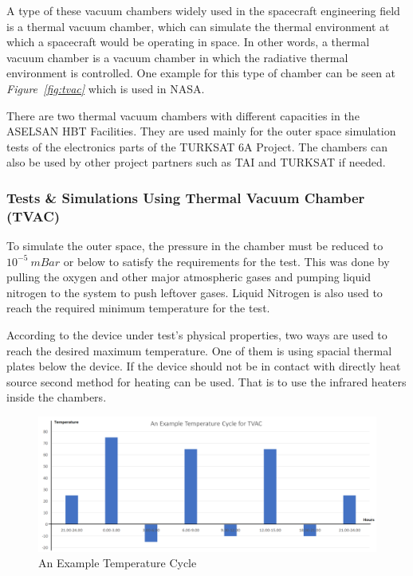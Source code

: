 	A type of these vacuum chambers widely used in the spacecraft engineering field is a thermal vacuum chamber, which can simulate the thermal environment at which a spacecraft would be operating in space. In other words,	a thermal vacuum chamber is a vacuum chamber in which the radiative thermal environment is controlled. One example for this type of chamber can be seen at \textit{Figure~\ref{fig:tvac}} which is used in NASA.


	There are two thermal vacuum chambers with different capacities in the ASELSAN HBT Facilities. They are used mainly for the outer space simulation tests of the electronics parts of the TURKSAT 6A Project. The chambers can also be used by other project partners such as TAI and TURKSAT if needed.
	
\subsubsection{Tests \& Simulations Using Thermal Vacuum Chamber (TVAC) }
\- \indent
	To simulate the outer space, the pressure in the chamber must be reduced to $10^{-5}~mBar$ or below to satisfy the requirements for the test. This was done by pulling the oxygen and other major atmospheric gases and pumping liquid nitrogen to the system to push leftover gases. Liquid Nitrogen is also used to reach the required minimum temperature for the test.
	
	According to the device under test's physical properties, two ways are used to reach the desired maximum temperature. One of them is using spacial thermal plates below the device. If the device should not be in contact with directly heat source second method for heating can be used.  That is to use the infrared heaters inside the chambers.
	
\begin{figure}[H]
	\center
	\setlength{\unitlength}{\textwidth} 
	\includegraphics[width=1.0\unitlength]{tvac-cycle}
	\caption{\label{fig:tvac-cycle}An Example Temperature Cycle }
\end{figure}


